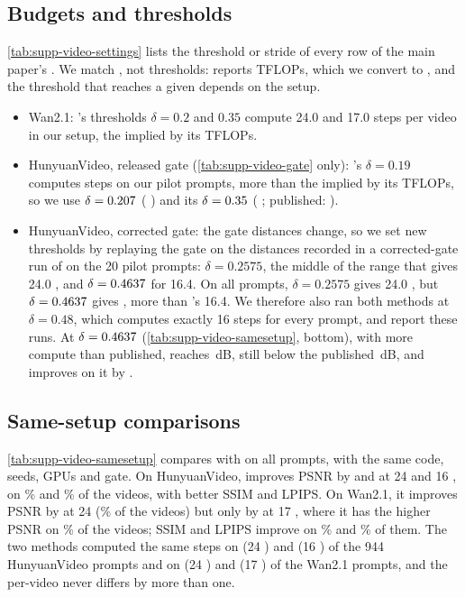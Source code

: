 \subsection{Budgets and thresholds}
\label{supp:video-budgets}
\cref{tab:supp-video-settings} lists the threshold or stride of every row of the main paper's .
We match \nfe, not thresholds: \seacache reports TFLOPs, which we convert to \nfe, and the threshold that reaches a given
\nfe depends on the setup.
\begin{itemize}[leftmargin=*,itemsep=1pt,topsep=2pt]
  \item Wan2.1: \seacache's thresholds $\delta=0.2$ and $0.35$ compute 24.0 and 17.0 steps per video in our setup, the
  \nfe implied by its TFLOPs.
  \item HunyuanVideo, released gate (\cref{tab:supp-video-gate} only): \seacache's $\delta=0.19$ computes
  \suppVidPubDeltaNfe{} steps on our \suppVidPubDeltaN{} pilot prompts, more than the \suppVidPubHiNfe{} implied by its
  TFLOPs, so we use $\delta=0.207$ (\suppVidRelHiNfe{} \nfe) and its $\delta=0.35$
  (\suppVidRelLoNfe{} \nfe; published: \suppVidPubLoNfe).
  \item HunyuanVideo, corrected gate: the gate distances change, so we set new thresholds by replaying the gate on the
  distances recorded in a corrected-gate run of \seacache on the 20 pilot prompts: $\delta=0.2575$, the middle of the
  range that gives 24.0 \nfe, and $\delta=0.4637$ for 16.4. On all prompts, $\delta=0.2575$ gives 24.0
  \nfe, but $\delta=0.4637$ gives \suppVidFirstLoNfe, more than \seacache's 16.4. We therefore also ran both
  methods at $\delta=0.48$, which computes exactly 16 steps for every prompt, and report these runs. At
  $\delta=0.4637$ (\cref{tab:supp-video-samesetup}, bottom), with more compute than published,
  \seacache reaches \suppVidFirstLoSea\,dB, still below the published \suppVidPubLo\,dB, and \ours improves on it by
  \suppVidFirstLoGain.
\end{itemize}



\subsection{Same-setup comparisons}
\label{supp:video-samesetup}
\cref{tab:supp-video-samesetup} compares \ours with \seacache on all prompts, with the same code, seeds,
GPUs and gate. On HunyuanVideo, \ours improves PSNR by \suppVidGainHA{} and \suppVidGainHB{} at 24 and 16 \nfe, on
\suppVidWinHA\% and \suppVidWinHB\% of the videos, with better SSIM and LPIPS. On Wan2.1, it improves PSNR by
\suppVidGainWA{} at 24 \nfe (\suppVidWinWA\% of the videos) but only by \suppVidGainWB{} at 17 \nfe, where it has the
higher PSNR on \suppVidWinWB\% of the videos; SSIM and LPIPS improve on \suppVidWinSsimWB\% and \suppVidWinLpipsWB\% of
them. The two methods computed the same steps on \suppVidSameHA{} (24 \nfe) and \suppVidSameHB{} (16 \nfe) of the 944
HunyuanVideo prompts and on \suppVidSameWA{} (24 \nfe) and \suppVidSameWB{} (17 \nfe) of the Wan2.1 prompts, and the
per-video \nfe never differs by more than one.


